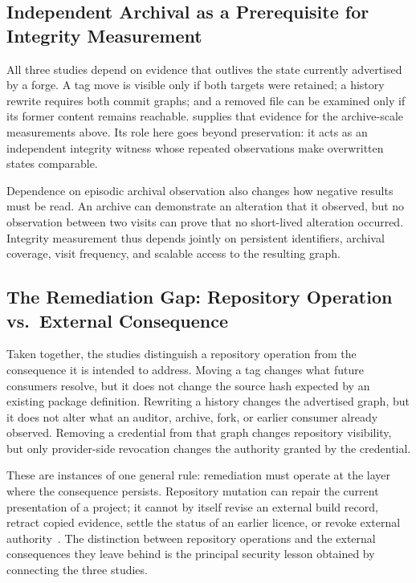 \subsection{Independent Archival as a Prerequisite for Integrity Measurement}
\label{subsec:concl-archive-instrument}

All three studies depend on evidence that outlives the state currently advertised by a forge.
A tag move is visible only if both targets were retained; a history rewrite requires both commit graphs; and a removed file can be examined only if its former content remains reachable.
\SWH supplies that evidence for the archive-scale measurements above.
Its role here goes beyond preservation: it acts as an independent integrity witness whose repeated observations make overwritten states comparable.

Dependence on episodic archival observation also changes how negative results must be read.
An archive can demonstrate an alteration that it observed, but no observation between two visits can prove that no short-lived alteration occurred.
Integrity measurement thus depends jointly on persistent identifiers, archival coverage, visit frequency, and scalable access to the resulting graph.

\subsection{The Remediation Gap: Repository Operation vs.\ External Consequence}
\label{subsec:concl-remediation-gap}

Taken together, the studies distinguish a repository operation from the consequence it is intended to address.
Moving a tag changes what future consumers resolve, but it does not change the source hash expected by an existing package definition.
Rewriting a history changes the advertised graph, but it does not alter what an auditor, archive, fork, or earlier consumer already observed.
Removing a credential from that graph changes repository visibility, but only provider-side revocation changes the authority granted by the credential.

These are instances of one general rule: remediation must operate at the layer where the consequence persists.
Repository mutation can repair the current presentation of a project; it cannot by itself revise an external build record, retract copied evidence, settle the status of an earlier licence, or revoke external authority~\cite{torresarias2016gitmetadata}.
The distinction between repository operations and the external consequences they leave behind is the principal security lesson obtained by connecting the three studies.

